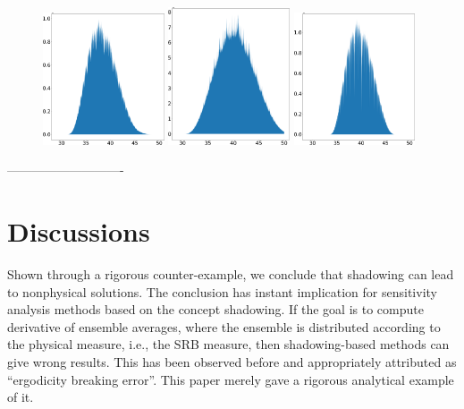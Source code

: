 \begin{figure}[H]
    \centering
    \includegraphics[width=0.32\textwidth]{figure/lorenz_shadow_lorenz_shadow_density_lorenz_zmax_15_28_2.67.json.png}
    \hspace{0.005\textwidth}
    \includegraphics[width=0.32\textwidth]{figure/lorenz_shadow_lorenz_shadow_density_lorenz_zmax_10_30_2.67.json.png}
    \hspace{0.005\textwidth}
    \includegraphics[width=0.32\textwidth]{figure/lorenz_shadow_lorenz_shadow_density_lorenz_zmax_10_28_3.33.json.png}
    \caption{
    }
    \label{fig:lorenz_params_scaled}
\end{figure}
----------------------------


\section{Discussions}
Shown through a rigorous counter-example, we conclude that shadowing can lead
to nonphysical solutions.  The conclusion has instant implication for
sensitivity analysis methods based on the concept shadowing.
If the goal is to compute derivative of ensemble averages, where the ensemble
is distributed according to the physical measure, i.e., the SRB measure,
then shadowing-based methods can give wrong results.  This has been observed
before and appropriately attributed as ``ergodicity breaking error''.
This paper merely gave a rigorous analytical example of it.

